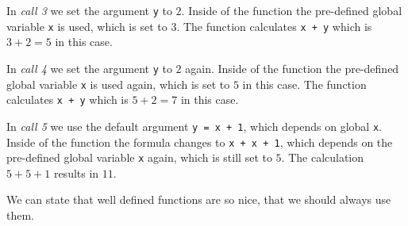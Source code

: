 \documentclass[11,]{article}
\begin{document}
In \emph{call 3} we set the argument \texttt{y} to \(2\). Inside of the
function the pre-defined global variable \texttt{x} is used, which is
set to \(3\). The function calculates \texttt{x + y} which is
\(3 + 2 = 5\) in this case.

In \emph{call 4} we set the argument \texttt{y} to \(2\) again. Inside
of the function the pre-defined global variable \texttt{x} is used
again, which is set to \(5\) in this case. The function calculates
\texttt{x + y} which is \(5 + 2 = 7\) in this case.

In \emph{call 5} we use the default argument \texttt{y = x + 1}, which
depends on global \texttt{x}. Inside of the function the formula changes
to \texttt{x + x + 1}, which depends on the pre-defined global variable
\texttt{x} again, which is still set to \(5\). The calculation
\(5 + 5 + 1\) results in \(11\).

We can state that well defined functions are so nice, that we should
always use them.
\end{document}
